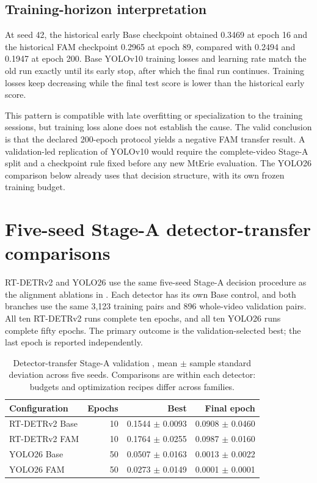 \subsection{Training-horizon interpretation}

At seed 42, the historical early Base checkpoint obtained 0.3469 at epoch
16 and the historical FAM checkpoint 0.2965 at epoch 89, compared with 0.2494
and 0.1947 at epoch 200. Base YOLOv10 training losses and learning rate match the
old run exactly until its early stop, after which the final run continues.
Training losses keep decreasing while the final test score is lower than the
historical early score.

This pattern is compatible with late overfitting or specialization to the
training sessions, but training loss alone does not establish the cause. The
valid conclusion is that the declared 200-epoch protocol yields a negative FAM
transfer result. A validation-led replication of YOLOv10 would require the
complete-video Stage-A split and a checkpoint rule fixed before any new
MtErie evaluation. The YOLO26 comparison below already uses that decision
structure, with its own frozen training budget.

\section{Five-seed Stage-A detector-transfer comparisons}
\label{sec:detector-stage-a-comparison}

RT-DETRv2 and YOLO26 use the same five-seed Stage-A decision procedure as the
alignment ablations in . Each detector has
its own Base control, and both branches use the same 3,123 training pairs
and 896 whole-video validation pairs. All ten RT-DETRv2 runs complete ten
epochs, and all ten YOLO26 runs complete fifty epochs. The primary outcome is
the validation-selected best; the last epoch is reported independently.

\begin{table}[htbp]
  \centering
  \caption{Detector-transfer Stage-A validation \mapfifty{}, mean \(\pm\)
  sample standard deviation across five seeds. Comparisons are within each
  detector: budgets and optimization recipes differ across families.}
  \label{tab:detector-stage-a-five-seed}
  \begin{tabular}{lrrr}
    \toprule
    Configuration & Epochs & Best & Final epoch \\
    \midrule
    RT-DETRv2 Base & 10 & 0.1544 \(\pm\) 0.0093 & 0.0908 \(\pm\) 0.0460 \\
    RT-DETRv2 FAM & 10 & 0.1764 \(\pm\) 0.0255 & 0.0987 \(\pm\) 0.0160 \\
    YOLO26 Base & 50 & 0.0507 \(\pm\) 0.0163 & 0.0013 \(\pm\) 0.0022 \\
    YOLO26 FAM & 50 & 0.0273 \(\pm\) 0.0149 & 0.0001 \(\pm\) 0.0001 \\
    \bottomrule
  \end{tabular}
\end{table}

